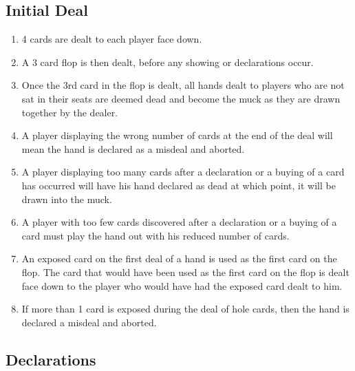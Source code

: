 \documentclass[a4paper,12pt]{article}
\begin{document}
\subsection{Initial Deal}
\begin{enumerate}
\item 4 cards are dealt to each player face down.

\item A 3 card flop is then dealt, before any showing or declarations occur.
\item Once the 3rd card in the flop is dealt, all hands dealt to players who are not sat in their seats are deemed dead and become the muck as they are drawn together by the dealer.
\item A player displaying the wrong number of cards at the end of the deal will mean the hand is declared as a misdeal and aborted.
\item A player displaying too many cards after a declaration or a buying of a card has occurred will have his hand declared as dead at which point, it will be drawn into the muck.
\item A player with too few cards discovered after a declaration or a buying of a card must play the hand out with his reduced number of cards.
\item An exposed card on the first deal of a hand is used as the first card on the flop. The card that would have been used as the first card on the flop is dealt face down to the player who would have had the exposed card dealt to him.
\item If more than 1 card is exposed during the deal of hole cards, then the hand is declared a misdeal and aborted.
\end{enumerate}


\subsection{Declarations}
\end{document}
